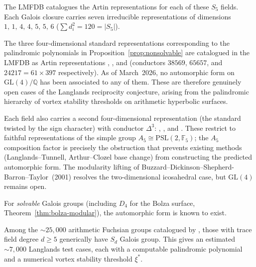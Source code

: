 \begin{remark}
\label{rem:langlands-test}
The LMFDB catalogues the Artin representations for each of
these $S_5$ fields.
Each Galois closure carries seven irreducible representations
of dimensions $1,\,1,\,4,\,4,\,5,\,5,\,6$
($\sum d_i^2 = 120 = |S_5|$).

The three four-dimensional standard representations
corresponding to the palindromic polynomials in
Proposition~\ref{prop:nonsolvable} are catalogued in the LMFDB
as Artin representations
,
, and
(conductors $38569$, $65657$, and $24217 = 61 \times 397$
respectively).
As of March~2026, no automorphic form on
$\mathrm{GL}(4)/\mathbb{Q}$ has been associated to any of them.
These are therefore genuinely open cases of the Langlands
reciprocity conjecture, arising from the palindromic hierarchy
of vortex stability thresholds on arithmetic hyperbolic surfaces.

Each field also carries a second four-dimensional representation
(the standard twisted by the sign character) with conductor
$\Delta^3$:
,
, and
.
These restrict to faithful representations of the simple group
$A_5 \cong \mathrm{PSL}(2, \mathbb{F}_5)$; the $A_5$
composition factor is precisely the obstruction that prevents
existing methods (Langlands--Tunnell, Arthur--Clozel base change)
from constructing the predicted automorphic form.
The modularity lifting of
Buzzard--Dickinson--Shepherd-Barron--Taylor~(2001) resolves
the two-dimensional icosahedral case, but
$\mathrm{GL}(4)$ remains open.

For \emph{solvable} Galois groups (including $D_4$ for the
Bolza surface, Theorem~\ref{thm:bolza-modular}), the
automorphic form is known to exist.

Among the ${\sim}25{,}000$ arithmetic Fuchsian groups
catalogued by \citet{Voight2021}, those with trace field degree
$d \ge 5$ generically have $S_d$ Galois group.
This gives an estimated ${\sim}7{,}000$ Langlands test cases,
each with a computable palindromic polynomial and a numerical
vortex stability threshold $\xi^*$.
\end{remark}





